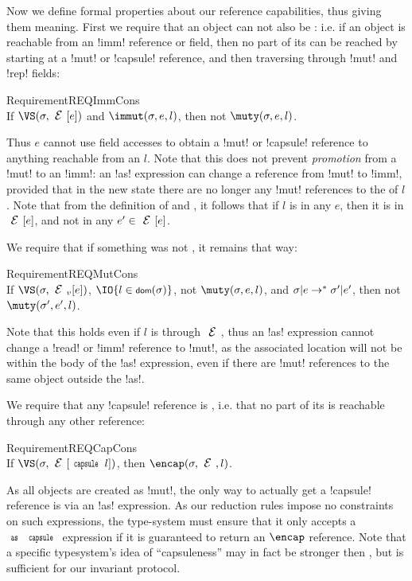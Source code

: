 Now we define formal properties about our reference capabilities, thus giving them meaning. First we require that
an \immut object can not also be \muty: i.e. if an object is reachable from an \Q!imm! reference or field, then no part of its \rog can be reached by starting at a \Q!mut! or \Q!capsule! reference, and then traversing through \Q!mut! and \Q!rep! fields:
\SS\begin{restatable}{Requirement}{REQImmCons}\ \\
	\indent If $\VS(\s, \E[e])$ and $\immut(\s, e, l)$, then not $\muty(\s, e, l)$.
\end{restatable}
\SS\noindent Thus $e$ cannot use field accesses to obtain a \Q!mut! or \Q!capsule! reference to anything reachable from an \immut $l$.
Note that this does not prevent \emph{promotion} from a \Q!mut! to an \Q!imm!: an \Q!as! expression can change a reference from \Q!mut! to \Q!imm!, provided that in the new state there are no longer any \Q!mut! references to the \rog of $l$. Note that from the definition of \muty and \immut, it follows that if $l$ is \immut in any $e$,
then it is \immut in $\E[e]$, and not \muty in any $e' \in \E[e]$.

\LS 

\noindent We require that if something was not \muty, it remains that way:%
\SS\begin{restatable}{Requirement}{REQMutCons}\ \\
	\indent If $\VS(\s, \EV[e])$, $\IO{l \in \dom(\s)}$, not $\muty(\s, e, l)$, and $\sigma|e \rightarrow^{*} \sigma'|e'$, then not $\muty(\s', e', l)$.
\end{restatable}
\SS\noindent Note that this holds even if $l$ is \muty through $\E$, thus an \Q!as! expression cannot change a \Q!read! or \Q!imm! reference to \Q!mut!, as the associated location will not be \muty within the body of the \Q!as! expression, even if there are \Q!mut! references to the same object outside the \Q!as!.

\LS

We require that any \Q!capsule! reference is \encap, i.e. that no \muty part of its \rog is reachable through any other reference:%
\SS\begin{restatable}{Requirement}{REQCapCons}\ \\
\indent If $\VS(\s,\E[\Kw{capsule}\,l])$, then $\encap(\s, \E, l)$.
\end{restatable}%
\SS\noindent As all objects are created as \Q!mut!, the only way to actually get a \Q!capsule! reference is via an \Q!as! expression.
As our reduction rules impose no constraints on such expressions, the type-system must ensure that it only accepts a $\Kw{as}\,\Kw{capsule}$ expression if it is guaranteed to 
return an $\encap$ reference. Note that a specific typesystem's idea of ``capsuleness'' may in fact be stronger then \encap, but \encap is sufficient for our invariant protocol.

